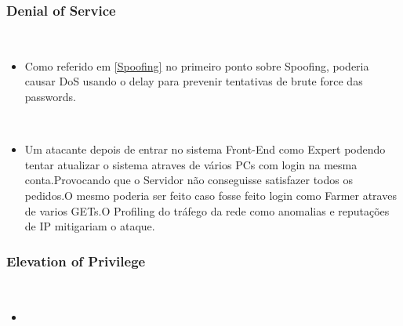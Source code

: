 \subsubsection{Denial of Service}
\hfill\\
\begin{itemize}

\item Como referido em \ref{Spoofing} no primeiro ponto sobre Spoofing, poderia causar DoS usando o delay para prevenir tentativas de brute force das passwords.

\hfill\\
\item Um atacante depois de entrar no sistema Front-End como Expert podendo tentar atualizar o sistema atraves de vários PCs com login na mesma conta.Provocando que o Servidor não conseguisse satisfazer todos os pedidos.O mesmo poderia ser feito caso fosse feito login como Farmer atraves de varios GETs.O Profiling do tráfego da rede como anomalias e reputações de IP mitigariam o ataque.

\end{itemize}

\subsubsection{Elevation of Privilege}
\hfill\\

\begin{itemize}

\item

\end{itemize}

